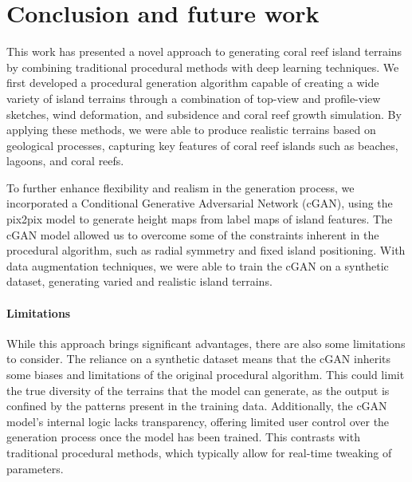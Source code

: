 \documentclass{egpubl}
\begin{document}
\section{Conclusion and future work}

This work has presented a novel approach to generating coral reef island terrains by combining traditional procedural methods with deep learning techniques. We first developed a procedural generation algorithm capable of creating a wide variety of island terrains through a combination of top-view and profile-view sketches, wind deformation, and subsidence and coral reef growth simulation. By applying these methods, we were able to produce realistic terrains based on geological processes, capturing key features of coral reef islands such as beaches, lagoons, and coral reefs.

To further enhance flexibility and realism in the generation process, we incorporated a Conditional Generative Adversarial Network (cGAN), using the pix2pix model to generate height maps from label maps of island features. The cGAN model allowed us to overcome some of the constraints inherent in the procedural algorithm, such as radial symmetry and fixed island positioning. With data augmentation techniques, we were able to train the cGAN on a synthetic dataset, generating varied and realistic island terrains.

\paragraph{Limitations} 
While this approach brings significant advantages, there are also some limitations to consider. The reliance on a synthetic dataset means that the cGAN inherits some biases and limitations of the original procedural algorithm. This could limit the true diversity of the terrains that the model can generate, as the output is confined by the patterns present in the training data. Additionally, the cGAN model's internal logic lacks transparency, offering limited user control over the generation process once the model has been trained. This contrasts with traditional procedural methods, which typically allow for real-time tweaking of parameters.
\end{document}
